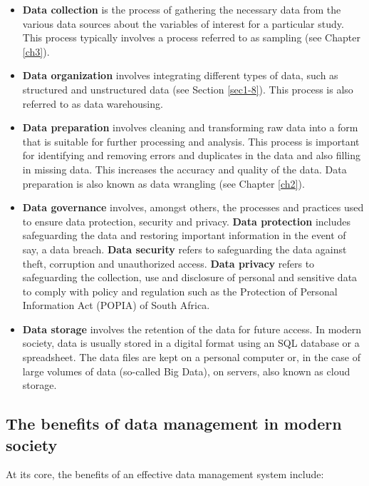 \documentclass[
]{book}
\begin{document}
\begin{itemize}
\item
  \textbf{Data collection} is the process of gathering the necessary data from the various data sources about the variables of interest for a particular study. This process typically involves a process referred to as sampling (see Chapter \ref{ch3}).
\item
  \textbf{Data organization} involves integrating different types of data, such as structured and unstructured data (see Section \ref{sec1-8}). This process is also referred to as data warehousing.
\item
  \textbf{Data preparation} involves cleaning and transforming raw data into a form that is suitable for further processing and analysis. This process is important for identifying and removing errors and duplicates in the data and also filling in missing data. This increases the accuracy and quality of the data. Data preparation is also known as data wrangling (see Chapter \ref{ch2}).
\item
  \textbf{Data governance} involves, amongst others, the processes and practices used to ensure data protection, security and privacy. \textbf{Data protection} includes safeguarding the data and restoring important information in the event of say, a data breach. \textbf{Data security} refers to safeguarding the data against theft, corruption and unauthorized access. \textbf{Data privacy} refers to safeguarding the collection, use and disclosure of personal and sensitive data to comply with policy and regulation such as the Protection of Personal Information Act (POPIA) of South Africa.
\item
  \textbf{Data storage} involves the retention of the data for future access. In modern society, data is usually stored in a digital format using an SQL database or a spreadsheet. The data files are kept on a personal computer or, in the case of large volumes of data (so-called Big Data), on servers, also known as cloud storage.
\end{itemize}

\subsection{The benefits of data management in modern society}\label{the-benefits-of-data-management-in-modern-society}

At its core, the benefits of an effective data management system include:
\end{document}
